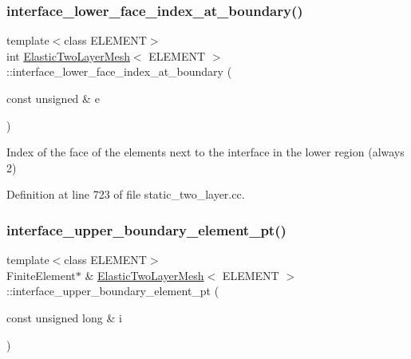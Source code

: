 \subsubsection{\texorpdfstring{interface\+\_\+lower\+\_\+face\+\_\+index\+\_\+at\+\_\+boundary()}{interface\_lower\_face\_index\_at\_boundary()}}
{\footnotesize\ttfamily template$<$class E\+L\+E\+M\+E\+NT$>$ \\
int \hyperlink{classElasticTwoLayerMesh}{Elastic\+Two\+Layer\+Mesh}$<$ E\+L\+E\+M\+E\+NT $>$\+::interface\+\_\+lower\+\_\+face\+\_\+index\+\_\+at\+\_\+boundary (\begin{DoxyParamCaption}\item[{const unsigned \&}]{e }\end{DoxyParamCaption})\hspace{0.3cm}{\ttfamily [inline]}}



Index of the face of the elements next to the interface in the lower region (always 2) 



Definition at line 723 of file static\+\_\+two\+\_\+layer.\+cc.

\mbox{\label{classElasticTwoLayerMesh_a5170e0a70ad0d4eb3ec01c32d3db2c72}} 
\subsubsection{\texorpdfstring{interface\+\_\+upper\+\_\+boundary\+\_\+element\+\_\+pt()}{interface\_upper\_boundary\_element\_pt()}}
{\footnotesize\ttfamily template$<$class E\+L\+E\+M\+E\+NT$>$ \\
Finite\+Element$\ast$ \& \hyperlink{classElasticTwoLayerMesh}{Elastic\+Two\+Layer\+Mesh}$<$ E\+L\+E\+M\+E\+NT $>$\+::interface\+\_\+upper\+\_\+boundary\+\_\+element\+\_\+pt (\begin{DoxyParamCaption}\item[{const unsigned long \&}]{i }\end{DoxyParamCaption})\hspace{0.3cm}{\ttfamily [inline]}}



